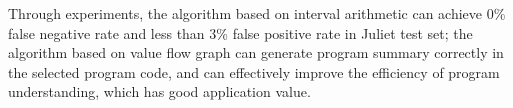 \begin{abstract*}
Through experiments, the algorithm based on interval arithmetic can achieve 0\% false negative rate and less than 3\% false positive rate in Juliet test set; the algorithm based on value flow graph can generate program summary correctly in the selected program code, and can effectively improve the efficiency of program understanding, which has good application value.

\end{abstract*}
